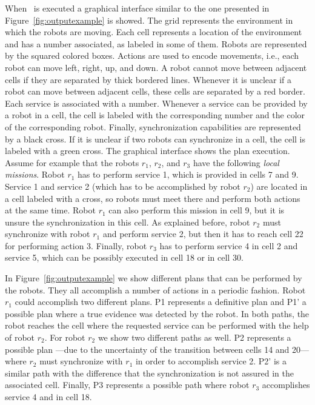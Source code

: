 When  \toolName\ is executed a graphical interface similar to the one presented  in Figure~\ref{fig:outputexample} is showed.
The grid represents the environment in which the robots are moving.
Each cell represents a location of the environment and has a number associated, as labeled in some of them.
Robots are represented by the squared colored boxes.
Actions are used to encode movements, i.e., each robot can move left, right, up, and down.
A robot  cannot move between adjacent cells if they are separated by thick bordered lines.
Whenever  it is unclear if a robot can move between adjacent cells, these cells are separated by a red border.
Each service is associated with a number.
Whenever a service can be provided by a robot in a cell, the cell is labeled with the corresponding number and the color of the corresponding robot.
Finally, synchronization capabilities are represented by a black cross.
If it is unclear if two robots can synchronize in a cell, the cell is labeled with a green cross.
The graphical interface shows the plan execution.
Assume for example that the robots $r_1$, $r_2$, and $r_3$ have the following \emph{local missions}.
Robot $r_1$ has to perform service 1, which is provided in cells 7 and 9.
Service 1 and service 2 (which has to be accomplished by robot $r_2$) are located in a cell labeled with a cross, so robots must meet there and perform both actions at the same time.
Robot $r_1$ can also perform this mission in cell 9, but it is unsure the synchronization in this cell.
As explained before, robot $r_2$ must synchronize with robot $r_1$ and perform service 2, but then it has to reach cell 22 for performing action 3.
Finally, robot $r_3$ has to perform service 4 in cell 2 and service 5, which can be possibly executed in cell 18 or in cell 30.

In Figure~\ref{fig:outputexample} we show different plans that can be performed by the robots. 
They all accomplish a number of actions in a periodic fashion.
Robot $r_1$ could accomplish two different plans.
P1 represents a definitive plan and P1' a possible plan where a true evidence was detected by the robot.
In both paths, the robot reaches the cell where the requested service can be performed with the help of robot $r_2$.
For robot $r_2$ we show two different paths as well.
P2 represents a possible plan ---due to the uncertainty of the transition between cells 14 and 20--- where $r_2$ must synchronize with $r_1$ in order to accomplish service 2.
P2' is a similar path with the difference that the synchronization is not assured in the associated cell.
Finally, P3 represents a possible path where robot $r_3$ accomplishes service 4 and  in cell 18.

